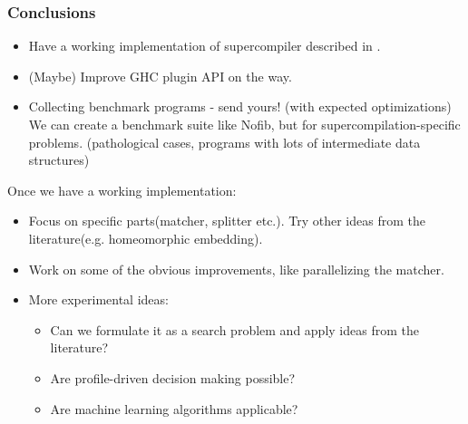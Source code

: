 \documentclass{beamer}
\begin{document}
\begin{frame}
    \frametitle{Conclusions}

    \begin{itemize}[<+->]
        \item[]
            Have a working implementation of supercompiler described in
            \citet{callbyneed-sc}.
        \item[]
            (Maybe) Improve GHC plugin API on the way.
        \item[]
            Collecting benchmark programs - send yours! (with expected
            optimizations)
            \newline
            We can create a benchmark suite like Nofib, but for
            supercompilation-specific problems. (pathological cases, programs
            with lots of intermediate data structures)
    \end{itemize}
\end{frame}

\begin{frame}
    Once we have a working implementation:
    \begin{itemize}
        \item
            Focus on specific parts(matcher, splitter etc.). Try other
            ideas from the literature(e.g. homeomorphic embedding).
        \item
            Work on some of the obvious improvements, like parallelizing
            the matcher.
        \item
            More experimental ideas:
            \begin{itemize}
                \item[]
                    Can we formulate it as a search problem and apply
                    ideas from the literature?
                \item[]
                    Are profile-driven decision making possible?
                \item[]
                    Are machine learning algorithms applicable?
            \end{itemize}
    \end{itemize}
\end{frame}
\end{document}
